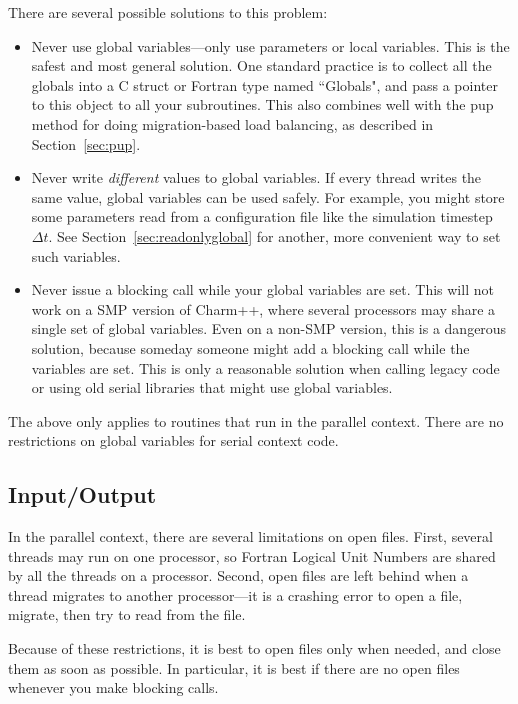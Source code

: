 \documentclass[10pt]{article}
\begin{document}
There are several possible solutions to this problem:

\begin{itemize}
\item Never use global variables---only use parameters or local variables.  
This is the safest and most general solution.
One standard practice is to collect all the globals into a C struct or 
Fortran type named ``Globals", and pass a pointer to this object to all
your subroutines.  This also combines well with the pup method for doing
migration-based load balancing, as described in Section~\ref{sec:pup}.

\item Never write {\em different} values to global variables.  If every thread
writes the same value, global variables can be used safely.  For example,
you might store some parameters read from a configuration file like the 
simulation timestep $\Delta t$.  See Section~\ref{sec:readonlyglobal}
for another, more convenient way to set such variables.

\item Never issue a blocking call while your global variables are set.
This will not work on a SMP version of Charm++, where several processors
may share a single set of global variables.
Even on a non-SMP version, this is a dangerous solution, because someday 
someone might add a blocking call while the variables are set.  
This is only a reasonable solution when calling legacy code or 
using old serial libraries that might use global variables.
\end{itemize}

The above only applies to routines that run in the parallel context.
There are no restrictions on global variables for serial context
code.



\subsection{Input/Output}
\label{sec:io}

In the parallel context, there are several limitations on open
files.  First, several threads may run on one processor, so
Fortran Logical Unit Numbers are shared by all the threads on
a processor.  Second, open files are left behind when a thread 
migrates to another processor---it is a crashing error to open a 
file, migrate, then try to read from the file.

Because of these restrictions, it is best to open files only when
needed, and close them as soon as possible.  In particular, it
is best if there are no open files whenever you make blocking calls.
\end{document}

